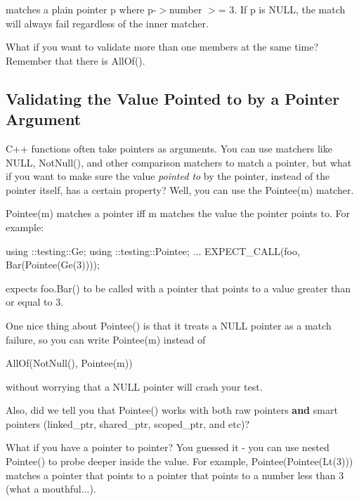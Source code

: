 matches a plain pointer {\ttfamily p} where {\ttfamily p-\/$>$number $>$= 3}. If {\ttfamily p} is {\ttfamily N\+U\+LL}, the match will always fail regardless of the inner matcher.

What if you want to validate more than one members at the same time? Remember that there is {\ttfamily All\+Of()}.

\subsection*{Validating the Value Pointed to by a Pointer Argument}

C++ functions often take pointers as arguments. You can use matchers like {\ttfamily N\+U\+LL}, {\ttfamily Not\+Null()}, and other comparison matchers to match a pointer, but what if you want to make sure the value {\itshape pointed to} by the pointer, instead of the pointer itself, has a certain property? Well, you can use the {\ttfamily Pointee(m)} matcher.

{\ttfamily Pointee(m)} matches a pointer iff {\ttfamily m} matches the value the pointer points to. For example\+:


\begin{DoxyCode}
using ::testing::Ge;
using ::testing::Pointee;
...
  EXPECT\_CALL(foo, Bar(Pointee(Ge(3))));
\end{DoxyCode}


expects {\ttfamily foo.\+Bar()} to be called with a pointer that points to a value greater than or equal to 3.

One nice thing about {\ttfamily Pointee()} is that it treats a {\ttfamily N\+U\+LL} pointer as a match failure, so you can write {\ttfamily Pointee(m)} instead of


\begin{DoxyCode}
AllOf(NotNull(), Pointee(m))
\end{DoxyCode}


without worrying that a {\ttfamily N\+U\+LL} pointer will crash your test.

Also, did we tell you that {\ttfamily Pointee()} works with both raw pointers {\bfseries and} smart pointers ({\ttfamily linked\+\_\+ptr}, {\ttfamily shared\+\_\+ptr}, {\ttfamily scoped\+\_\+ptr}, and etc)?

What if you have a pointer to pointer? You guessed it -\/ you can use nested {\ttfamily Pointee()} to probe deeper inside the value. For example, {\ttfamily Pointee(Pointee(\+Lt(3)))} matches a pointer that points to a pointer that points to a number less than 3 (what a mouthful...).

